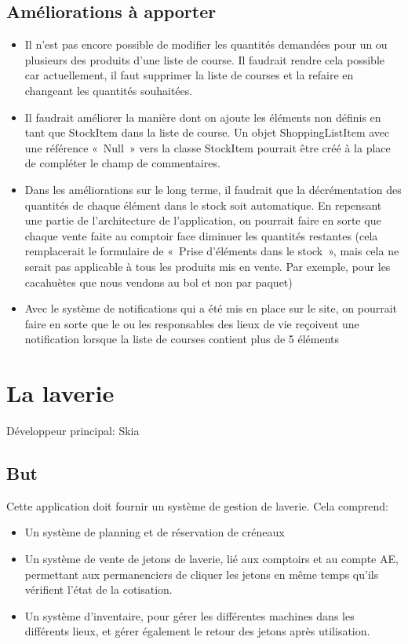 \documentclass[a4paper]{report}
\begin{document}
\section{Améliorations à apporter}
\label{sec:amelioration_a_apporter}

\begin{itemize}
    \item Il n'est pas encore possible de modifier les quantités demandées pour un ou plusieurs des produits d'une liste
        de course. Il faudrait rendre cela possible car actuellement, il faut supprimer la liste de courses et la
        refaire en changeant les quantités souhaitées.
    \item Il faudrait améliorer la manière dont on ajoute les éléments non définis en tant que StockItem dans la liste
        de course. Un objet ShoppingListItem avec une référence « Null » vers la classe StockItem pourrait être créé à
        la place de compléter le champ de commentaires.
    \item Dans les améliorations sur le long terme, il faudrait que la décrémentation des quantités de chaque élément
        dans le stock soit automatique. En repensant une partie de l'architecture de l'application, on pourrait faire en
        sorte que chaque vente faite au comptoir face diminuer les quantités restantes (cela remplacerait le formulaire
        de « Prise d'éléments dans le stock », mais cela ne serait pas applicable à tous les produits mis en vente. Par
        exemple, pour les cacahuètes que nous vendons au bol et non par paquet)
    \item Avec le système de notifications qui a été mis en place sur le site, on pourrait faire en sorte que le ou les
        responsables des lieux de vie reçoivent une notification lorsque la liste de courses contient plus de 5 éléments
\end{itemize}


\chapter{La laverie}
\label{sec:la_laverie}
\par Développeur principal: Skia

\section{But}
\label{sub:but}
\par Cette application doit fournir un système de gestion de laverie. Cela comprend:
\begin{itemize}
    \item Un système de planning et de réservation de créneaux
    \item Un système de vente de jetons de laverie, lié aux comptoirs et au compte AE, permettant aux permanenciers de
        cliquer les jetons en même temps qu'ils vérifient l'état de la cotisation.
    \item Un système d'inventaire, pour gérer les différentes machines dans les différents lieux, et gérer également le
        retour des jetons après utilisation.
\end{itemize}
\end{document}
